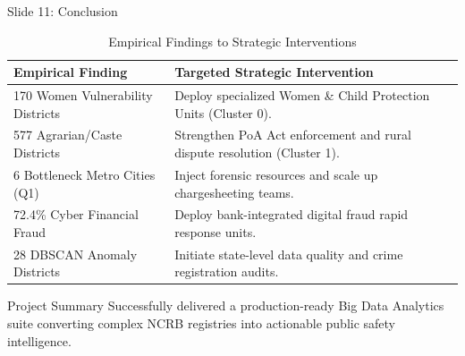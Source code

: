 \documentclass[aspectratio=169,10pt]{beamer}
\begin{document}
\begin{frame}{Slide 11: Conclusion}
    \begin{table}[h]
        \centering
        \scriptsize
        \caption{Empirical Findings to Strategic Interventions}
        \begin{tabular}{lp{6.5cm}}
            \toprule
            \textbf{Empirical Finding} & \textbf{Targeted Strategic Intervention} \\
            \midrule
            170 Women Vulnerability Districts & Deploy specialized Women \& Child Protection Units (Cluster 0). \\
            577 Agrarian/Caste Districts & Strengthen PoA Act enforcement and rural dispute resolution (Cluster 1). \\
            6 Bottleneck Metro Cities (Q1) & Inject forensic resources and scale up chargesheeting teams. \\
            72.4\% Cyber Financial Fraud & Deploy bank-integrated digital fraud rapid response units. \\
            28 DBSCAN Anomaly Districts & Initiate state-level data quality and crime registration audits. \\
            \bottomrule
        \end{tabular}
    \end{table}

    \begin{block}{Project Summary}
        Successfully delivered a production-ready Big Data Analytics suite converting complex NCRB registries into actionable public safety intelligence.
    \end{block}
\end{frame}
\end{document}
